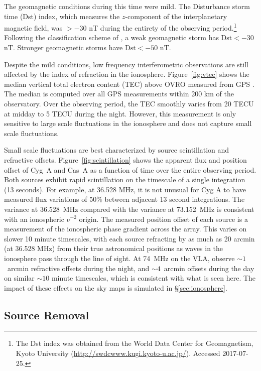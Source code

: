 \documentclass[twocolumn]{aastex61}
\begin{document}
The geomagnetic conditions during this time were mild. The Disturbance storm time (Dst) index, which
measures the $z$-component of the interplanetary magnetic field, was
$>-30$ nT during the entirety of the observing period.\footnote{
    The Dst index was obtained from the World Data Center for Geomagnetism, Kyoto University
    (\url{http://swdcwww.kugi.kyoto-u.ac.jp/}). Accessed 2017-07-25.
}
Following the classification scheme of \citet{2008GMS...181.....K}, a weak geomagnetic storm has
$\text{Dst} < -30$ nT. Stronger geomagnetic storms have $\text{Dst} < -50$ nT.

Despite the mild conditions, low frequency interferometric observations are still affected by the
index of refraction in the ionosphere.  Figure~\ref{fig:vtec} shows the median vertical total
electron content (TEC) above OVRO measured from GPS \citep{1999JASTP..61.1205I}. The median is
computed over all GPS measurements within 200 km of the observatory. Over the observing period, the
TEC smoothly varies from 20 TECU at midday to 5 TECU during the night. However, this measurement is
only sensitive to large scale fluctuations in the ionosphere and does not capture small scale
fluctuations.

Small scale fluctuations are best characterized by source scintillation and refractive offsets.
Figure~\ref{fig:scintillation} shows the apparent flux and position offset of Cyg~A and Cas~A as a
function of time over the entire observing period. Both sources exhibit rapid scintillation on the
timescale of a single integration (13 seconds). For example, at 36.528 MHz, it is not unusual for
Cyg A to have measured flux variations of 50\% between adjacent 13 second integrations.  The
variance at 36.528~MHz compared with the variance at 73.152~MHz is consistent with an ionospheric
$\nu^{-2}$ origin. The measured position offset of each source is a measurement of the ionospheric
phase gradient across the array.  This varies on slower 10 minute timescales, with each source
refracting by as much as 20 arcmin (at 36.528 MHz) from their true astronomical positions as waves
in the ionosphere pass through the line of sight. At 74~MHz on the VLA, \citet{2007ApJS..172..686K}
observe $\sim 1$~arcmin refractive offsets during the night, and $\sim 4$~arcmin offsets during the
day on similar $\sim10$ minute timescales, which is consistent with what is seen here.  The impact
of these effects on the sky maps is simulated in \S\ref{sec:ionosphere}.

\subsection{Source Removal}\label{sec:source-removal}
\end{document}
